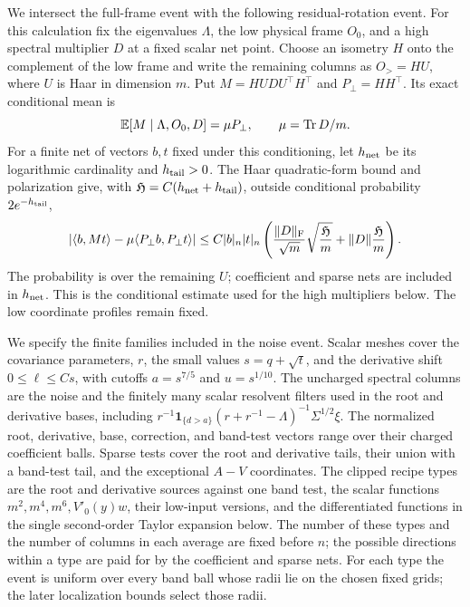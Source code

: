 We intersect the full-frame event with the following residual-rotation
event. For this calculation fix the eigenvalues \(\Lambda\), the low
physical frame \(O_0\), and a high spectral multiplier \(D\) at a fixed
scalar net point. Choose an isometry \(H\) onto the complement of the low
frame and write the remaining columns as \(O_>=HU\), where \(U\) is Haar
in dimension \(m\). Put \(M=HUDU^\top H^\top\) and
\(P_\perp=HH^\top\). Its exact conditional mean is
\[
 \mathbb E[M\mid\Lambda,O_0,D]=\mu P_\perp,\qquad \mu=\operatorname{Tr} D/m.
\]
For a finite net of vectors \(b,t\) fixed under this conditioning, let
\(h_{\rm net}\) be its logarithmic cardinality and \(h_{\rm tail}>0\).
The Haar quadratic-form bound and polarization give, with
\(\mathfrak H=C(h_{\rm net}+h_{\rm tail})\), outside conditional probability
\(2e^{-h_{\rm tail}}\),
\begin{equation}\label{cap:conditional-high-test}
 \begin{split}
 |\langle b,Mt\rangle-\mu\langle P_\perp b,P_\perp t\rangle|
 \le C|b|_n|t|_n\left(
 \frac{\|D\|_{\rm F}}{\sqrt m}\sqrt{\frac{\mathfrak H}{m}}
       +\|D\|\frac{\mathfrak H}{m}\right).
 \end{split}
\end{equation}
The probability is over the remaining \(U\); coefficient and sparse nets
are included in \(h_{\rm net}\). This is the conditional estimate used for
the high multipliers below. The low coordinate profiles remain fixed.

We specify the finite families included in the noise event. Scalar meshes
cover the covariance parameters, \(r\), the small values \(s=q+\sqrt t\),
and the derivative shift \(0\le\ell\le Cs\), with cutoffs
\(a=s^{7/5}\) and \(u=s^{1/10}\).
The uncharged spectral columns are the noise and the finitely many scalar
resolvent filters used in the root and derivative bases, including
\(r^{-1}\mathbf1_{\{d>a\}}(r+r^{-1}-\Lambda)^{-1}\Sigma^{1/2}\xi\).
The normalized root, derivative, base, correction, and band-test vectors
range over their charged coefficient balls. Sparse tests cover the root and
derivative tails, their union with a band-test tail, and the exceptional
\(A-V\) coordinates. The clipped recipe types are the root and derivative
sources against one band test, the scalar functions \(m^2,m^4,m^6,V'_0(y)w\),
their low-input versions, and the differentiated functions in the single
second-order Taylor expansion below. The number of these types and the
number of columns in each average are fixed before \(n\); the possible
directions within a type are paid for by the coefficient and sparse nets.
For each type the event is uniform over every band ball whose radii lie on
the chosen fixed grids; the later localization bounds select those radii.

